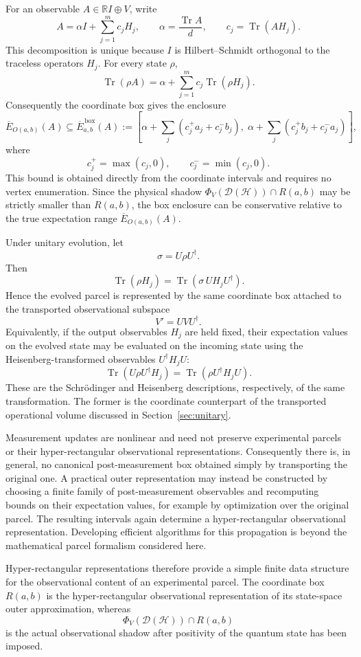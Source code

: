 \documentclass[11pt, onecolumn]{article}
\begin{document}
For an observable $A\in\mathbb RI\oplus V$, write
\[
A
=
\alpha I+\sum_{j=1}^m c_jH_j,
\qquad
\alpha=\frac{\operatorname{Tr}A}{d},
\qquad
c_j=\operatorname{Tr}(AH_j).
\]
This decomposition is unique because $I$ is Hilbert--Schmidt orthogonal
to the traceless operators $H_j$. For every state $\rho$,
\[
\operatorname{Tr}(\rho A)
=
\alpha+\sum_{j=1}^m
c_j\operatorname{Tr}(\rho H_j).
\]
Consequently the coordinate box gives the enclosure
\[
\overline E_{O(a,b)}(A)
\subseteq
\overline E^{\,\mathrm{box}}_{a,b}(A)
:=
\left[
\alpha+\sum_j(c_j^+a_j+c_j^-b_j),
\;
\alpha+\sum_j(c_j^+b_j+c_j^-a_j)
\right],
\]
where
\[
c_j^+=\max(c_j,0),
\qquad
c_j^-=\min(c_j,0).
\]
This bound is obtained directly from the coordinate intervals and
requires no vertex enumeration. Since the physical shadow
$\Phi_V(\mathcal D(\mathcal H))\cap R(a,b)$ may be strictly smaller
than $R(a,b)$, the box enclosure can be conservative relative to the
true expectation range $\overline E_{O(a,b)}(A)$.

Under unitary evolution, let
\[
\sigma=U\rho U^\dagger.
\]
Then
\[
\operatorname{Tr}(\rho H_j)
=
\operatorname{Tr}(\sigma\,UH_jU^\dagger).
\]
Hence the evolved parcel is represented by the same coordinate box
attached to the transported observational subspace
\[
V'=UVU^\dagger.
\]
Equivalently, if the output observables $H_j$ are held fixed, their
expectation values on the evolved state may be evaluated on the incoming
state using the Heisenberg-transformed observables $U^\dagger H_jU$:
\[
\operatorname{Tr}(U\rho U^\dagger H_j)
=
\operatorname{Tr}(\rho U^\dagger H_jU).
\]
These are the Schr\"odinger and Heisenberg descriptions, respectively,
of the same transformation. The former is the coordinate counterpart
of the transported operational volume discussed in
Section~\ref{sec:unitary}.

Measurement updates are nonlinear and need not preserve experimental
parcels or their hyper-rectangular observational representations.
Consequently there is, in general, no canonical post-measurement box
obtained simply by transporting the original one. A practical outer
representation may instead be constructed by choosing a finite family
of post-measurement observables and recomputing bounds on their
expectation values, for example by optimization over the original
parcel. The resulting intervals again determine a hyper-rectangular
observational representation. Developing efficient algorithms for this
propagation is beyond the mathematical parcel formalism considered here.

Hyper-rectangular representations therefore provide a simple finite data
structure for the observational content of an experimental parcel. The
coordinate box $R(a,b)$ is the hyper-rectangular observational
representation of its state-space outer approximation, whereas
\[
\Phi_V(\mathcal D(\mathcal H))\cap R(a,b)
\]
is the actual observational shadow after positivity of the quantum state
has been imposed.
\end{document}
